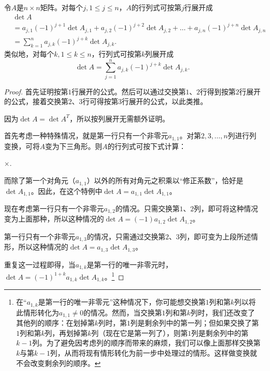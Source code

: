 \begin{theorem}
  令$A$是$n\times n$矩阵。对每个$j,1\le j\le n$，$A$的行列式可按第$j$行展开成
  \[\begin{aligned}
    &\det A\\
    &= a_{j,1}(-1)^{j+1}\det A_{j,1}+a_{j,2}(-1)^{j+2}\det A_{j,2}+\ldots+a_{j,n}(-1)^{j+n}\det A_{j,n}\\
    &=\sum_{k=1}^na_{j,k}(-1)^{j+k}\det A_{j,k}.
  \end{aligned}\]
  类似地，对每个$k,1\le k\le n$，行列式可按第$k$列展开成
  \[\det A=\sum_{j=1}^na_{j,k}(-1)^{j+k}\det A_{j,k}.\]
\end{theorem}
\begin{proof}
  首先证明按第$1$行展开的公式。然后可以通过交换第$1$、$2$行得到按第$2$行展开的公式，接着交换第$2$、$3$行可得按第$3$行展开的公式，以此类推。

  因为$\det A=\det A^T$，所以按列展开无需额外证明。

  首先考虑一种特殊情况，就是第一行只有一个非零元$a_{1,1}$。对第$2,3,\dots,n$列进行列变换，可将$A$变为下三角形。则$A$的行列式可按下式计算：
  \begin{center}
    $\times$.
  \end{center}
而除了第一个对角元（$a_{1,1}$）以外的所有对角元之积乘以“修正系数”，恰好是$\det A_{1,1}$。因此，在这个特例中$\det A = a_{1,1}\det A_{1,1}$。

  现在考虑第一行只有一个非零元$a_{1,2}$的情况。只需交换第$1$、$2$列，即可将这种情况变为上面那种，所以这种情况的$\det A=(-1)a_{1,2}\det A_{1,2}$。

  第一行只有一个非零元$a_{1,3}$的情况，只需通过交换第$2$、$3$列，即可变为上段所述情形，所以这种情况的$\det A=a_{1,3}\det A_{1,3}$。

  重复这一过程即得，当$a_{1,k}$是第一行的唯一非零元时，$\det A = (-1)^{1+k}a_{1,k}\det A_{1,k}$。\footnote{在“$a_{1,k}$是第一行的唯一非零元”这种情况下，你可能想交换第$1$列和第$k$列以将此情形转化为$a_{1,1}\ne 0$的情况。然而，当交换第$1$列和第$k$列时，我们还改变了其他列的顺序：在划掉第$k$列时，第$1$列是剩余列中的第一列；但如果交换了第$1$列和第$k$列，再划掉第$k$列（现在它是第一列了），则第$1$列是剩余列中的第$k-1$列。为了避免因考虑列的顺序而带来的麻烦，我们可以像上面那样交换第$k$与第$k-1$列，从而将现有情形转化为前一步中处理过的情形。这样做变换就不会改变剩余列的顺序。}


\end{proof}
